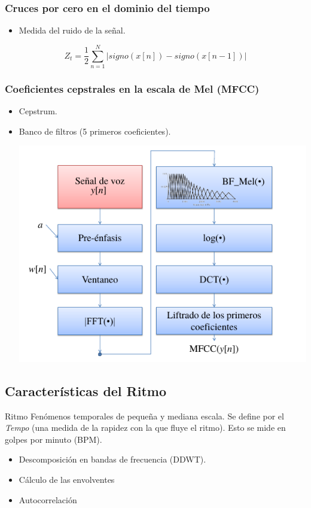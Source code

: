 \documentclass{beamer}
\begin{document}
\begin{frame}
\frametitle{Cruces por cero en el dominio del tiempo}
\begin{itemize}
\item Medida del ruido de la señal.
\end{itemize}

$$Z_t = \frac{1}{2} \sum_{n=1}^{N} |signo(x[n]) - signo(x[n-1])|$$ 

\end{frame}

\begin{frame}
\frametitle{Coeficientes cepstrales en la escala de Mel (MFCC)}
\begin{itemize}
\item Cepstrum.
\item Banco de filtros (5 primeros coeficientes).
\begin{center}
\includegraphics[width=0.7\linewidth]{mfcc}
\end{center}
\end{itemize}

\subsection{Características del Ritmo}

\end{frame}

\begin{frame}
\begin{block}{Ritmo}
Fenómenos temporales de pequeña y mediana escala. Se define por el \textit{Tempo} (una medida de la rapidez con la que fluye el ritmo). Esto se mide en golpes por minuto (BPM).
\end{block}

\begin{itemize}
\item Descomposición en bandas de frecuencia (DDWT).
\item Cálculo de las envolventes
\item Autocorrelación
\end{itemize}
\end{frame}
\end{document}
